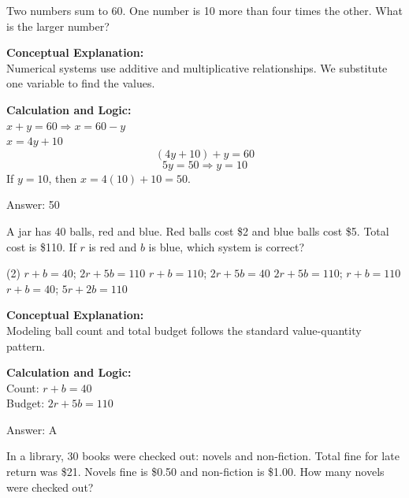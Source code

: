 \documentclass[11pt,paper=a4,answers]{exam}
\begin{document}
\begin{questions}
\question
Two numbers sum to 60. One number is 10 more than four times the other. What is the larger number?

\begin{solution}
\textbf{Conceptual Explanation:} \\
Numerical systems use additive and multiplicative relationships. We substitute one variable to find the values.

\vspace{10pt}
\textbf{Calculation and Logic:} \\
$x + y = 60 \Rightarrow x = 60 - y$ \\
$x = 4y + 10$ \\
\[(4y + 10) + y = 60\]
\[5y = 50 \Rightarrow y = 10\]
If $y = 10$, then $x = 4(10) + 10 = 50$.

\vspace{15pt}
Answer: \colorbox{yellow!100}{50}
\end{solution}

\question
A jar has 40 balls, red and blue. Red balls cost \$2 and blue balls cost \$5. Total cost is \$110. If $r$ is red and $b$ is blue, which system is correct?
\begin{tasks}(2)
    \task $r + b = 40$; $2r + 5b = 110$
    \task $r + b = 110$; $2r + 5b = 40$
    \task $2r + 5b = 110$; $r + b = 110$
    \task $r + b = 40$; $5r + 2b = 110$
\end{tasks}

\begin{solution}
\textbf{Conceptual Explanation:} \\
Modeling ball count and total budget follows the standard value-quantity pattern.

\vspace{10pt}
\textbf{Calculation and Logic:} \\
Count: $r + b = 40$ \\
Budget: $2r + 5b = 110$

\vspace{15pt}
Answer: \colorbox{yellow!100}{A}
\end{solution}

\question
In a library, 30 books were checked out: novels and non-fiction. Total fine for late return was \$21. Novels fine is \$0.50 and non-fiction is \$1.00. How many novels were checked out?


\end{questions}
\end{document}
